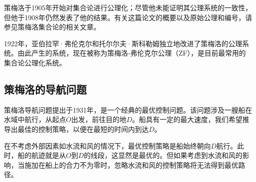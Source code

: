 策梅洛于1905年开始对集合论进行公理化；尽管他未能证明其公理系统的一致性，但他于1908年仍然发表了他的结果。有关这篇论文的概要以及原始公理和编号，请参见策梅洛集合论的相关文章。

1922年，亚伯拉罕·弗伦克尔和托尔尔夫·斯科勒姆独立地改进了策梅洛的公理系统。由此产生的系统，现在被称为策梅洛-弗伦克尔公理（ZF），是目前最常用的集合论公理化系统。
\subsection{策梅洛的导航问题}
策梅洛导航问题提出于1931年，是一个经典的最优控制问题。该问题涉及一艘船在水域中航行，从起点\(O\)出发，前往目的地\(D\)。船具有一定的最大速度，我们希望推导出最佳的控制策略，以便在最短的时间内到达\(D\)。

在不考虑外部因素如水流和风的情况下，最优控制策略是船始终朝向\(D\)航行。此时，船的航迹就是从\(O\)到\(D\)的线段，这显然是最优的。但如果考虑到水流和风的影响，当施加在船上的合力不为零时，忽略水流和风的控制策略将无法得到最优路径。
